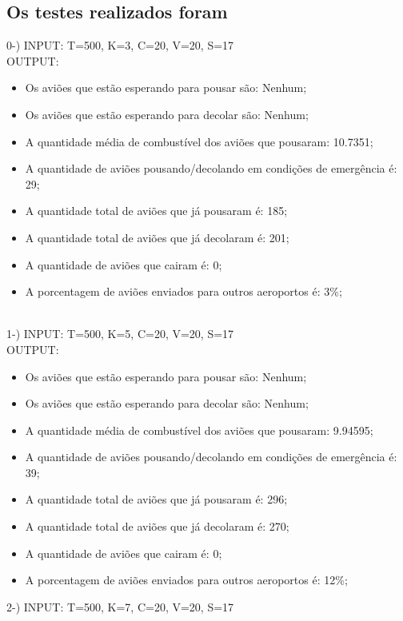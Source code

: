 \documentclass{article}
\begin{document}
\subsection{Os testes realizados foram}
0-) INPUT: T=500, K=3, C=20, V=20, S=17\\
   
OUTPUT: 
\begin{itemize}
   \item Os aviões que estão esperando para pousar são: Nenhum;
   \item Os aviões que estão esperando para decolar são: Nenhum;
   \item A quantidade média de combustível dos aviões que pousaram: 10.7351;
   \item A quantidade de aviões pousando/decolando em condições de emergência é: 29;
   \item A quantidade total de aviões que já pousaram é: 185;
   \item A quantidade total de aviões que já decolaram é: 201;
   \item A quantidade de aviões que cairam é: 0;
   \item A porcentagem de aviões enviados para outros aeroportos é: 3\%;
\end{itemize}
\\
1-) INPUT: T=500, K=5, C=20, V=20, S=17\\
   
OUTPUT: 
\begin{itemize}
   \item Os aviões que estão esperando para pousar são: Nenhum;
   \item Os aviões que estão esperando para decolar são: Nenhum;
   \item A quantidade média de combustível dos aviões que pousaram: 9.94595;
   \item A quantidade de aviões pousando/decolando em condições de emergência é: 39;
   \item A quantidade total de aviões que já pousaram é: 296;
   \item A quantidade total de aviões que já decolaram é: 270;
   \item A quantidade de aviões que cairam é: 0;
   \item A porcentagem de aviões enviados para outros aeroportos é: 12\%;
\end{itemize}

2-) INPUT: T=500, K=7, C=20, V=20, S=17\\
\end{document}
